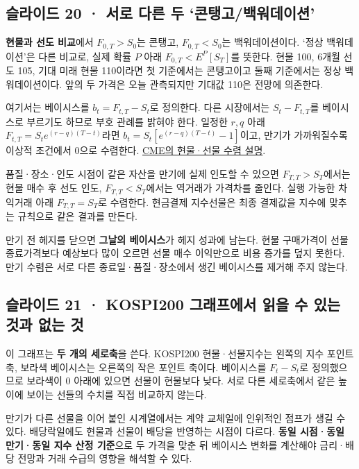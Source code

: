 \documentclass[11pt,a4paper]{article}
\begin{document}
\subsection{슬라이드 20 · 서로 다른 두 ‘콘탱고/백워데이션’}
\textbf{현물과 선도 비교}에서 $F_{0,T}>S_0$는 콘탱고, $F_{0,T}<S_0$는 백워데이션이다. ‘정상 백워데이션’은 다른 비교로, 실제 확률 $P$ 아래 $F_{0,T}<E^P[S_T]$를 뜻한다. 현물 100, 6개월 선도 105, 기대 미래 현물 110이라면 첫 기준에서는 콘탱고이고 둘째 기준에서는 정상 백워데이션이다. 앞의 두 가격은 오늘 관측되지만 기대값 110은 전망에 의존한다.\par

여기서는 베이시스를 $b_t=F_{t,T}-S_t$로 정의한다. 다른 시장에서는 $S_t-F_{t,T}$를 베이시스로 부르기도 하므로 부호 관례를 밝혀야 한다. 일정한 $r,q$ 아래 $F_{t,T}=S_te^{(r-q)(T-t)}$라면 $b_t=S_t[e^{(r-q)(T-t)}-1]$이고, 만기가 가까워질수록 이상적 조건에서 0으로 수렴한다. \href{https://www.cmegroup.com/education/courses/introduction-to-grains-and-oilseeds/learn-about-grain-convergence}{CME의 현물·선물 수렴 설명}.\par

품질·장소·인도 시점이 같은 자산을 만기에 실제 인도할 수 있으면 $F_{T,T}>S_T$에서는 현물 매수 후 선도 인도, $F_{T,T}<S_T$에서는 역거래가 가격차를 줄인다. 실행 가능한 차익거래 아래 $F_{T,T}=S_T$로 수렴한다. 현금결제 지수선물은 최종 결제값을 지수에 맞추는 규칙으로 같은 결과를 만든다.\par

만기 전 헤지를 닫으면 \textbf{그날의 베이시스}가 헤지 성과에 남는다. 현물 구매가격이 선물 종료가격보다 예상보다 많이 오르면 선물 매수 이익만으로 비용 증가를 덮지 못한다. 만기 수렴은 서로 다른 종료일·품질·장소에서 생긴 베이시스를 제거해 주지 않는다.\par

\subsection{슬라이드 21 · KOSPI200 그래프에서 읽을 수 있는 것과 없는 것}
이 그래프는 \textbf{두 개의 세로축}을 쓴다. KOSPI200 현물·선물지수는 왼쪽의 지수 포인트 축, 보라색 베이시스는 오른쪽의 작은 포인트 축이다. 베이시스를 $F_t-S_t$로 정의했으므로 보라색이 0 아래에 있으면 선물이 현물보다 낮다. 서로 다른 세로축에서 같은 높이에 보이는 선들의 수치를 직접 비교하지 않는다.\par

만기가 다른 선물을 이어 붙인 시계열에서는 계약 교체일에 인위적인 점프가 생길 수 있다. 배당락일에도 현물과 선물이 배당을 반영하는 시점이 다르다. \textbf{동일 시점·동일 만기·동일 지수 산정 기준}으로 두 가격을 맞춘 뒤 베이시스 변화를 계산해야 금리·배당 전망과 거래 수급의 영향을 해석할 수 있다.\par
\end{document}
